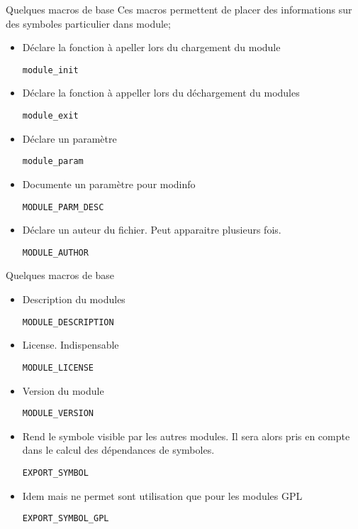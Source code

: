 \begin{frame}[fragile=singleslide]{Quelques macros de base}
  Ces macros  permettent de placer  des informations sur  des symboles
  particulier dans module;
  \begin{itemize}
  \item Déclare la fonction à apeller lors du chargement du module
    \begin{lstlisting}
module_init
    \end{lstlisting}
  \item Déclare la fonction à appeller lors du déchargement du modules
    \begin{lstlisting}
module_exit
    \end{lstlisting}
  \item Déclare un paramètre
    \begin{lstlisting}
module_param
    \end{lstlisting}
  \item Documente un paramètre pour modinfo
    \begin{lstlisting}
MODULE_PARM_DESC
    \end{lstlisting}
  \item Déclare un auteur du fichier. Peut apparaitre plusieurs fois.
    \begin{lstlisting}
MODULE_AUTHOR
    \end{lstlisting}
  \end{itemize}
\end{frame}
\begin{frame}[fragile=singleslide]{Quelques macros de base}
  \begin{itemize}
  \item Description du modules
    \begin{lstlisting}
MODULE_DESCRIPTION
    \end{lstlisting}
  \item License. Indispensable
    \begin{lstlisting}
MODULE_LICENSE
    \end{lstlisting}
  \item Version du module
    \begin{lstlisting}
MODULE_VERSION
    \end{lstlisting}
  \item Rend le symbole visible par les autres modules.  Il sera alors
    pris en compte dans le calcul des dépendances de symboles.
    \begin{lstlisting}
EXPORT_SYMBOL
    \end{lstlisting}
  \item Idem  mais  ne permet sont utilisation que
    pour les modules GPL
    \begin{lstlisting}
EXPORT_SYMBOL_GPL
    \end{lstlisting}
  \end{itemize}
\end{frame}

